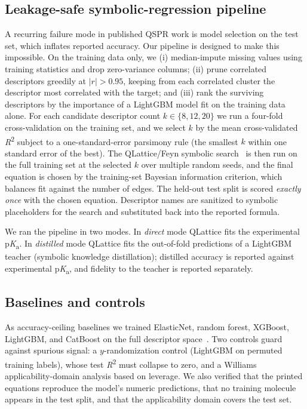 \documentclass[11pt]{article}
\newcommand{\pka}{p\textit{K}\textsubscript{a}}
\newcommand{\rtwo}{\textit{R}\textsuperscript{2}}
\begin{document}
\subsection{Leakage-safe symbolic-regression pipeline}
\label{sec:pipeline}

A recurring failure mode in published QSPR work is model selection on the test set, which
inflates reported accuracy. Our pipeline is designed to make this impossible. On the training
data only, we (i) median-impute missing values using training statistics and drop zero-variance
columns; (ii) prune correlated descriptors greedily at $|r|>0.95$, keeping from each correlated
cluster the descriptor most correlated with the target; and (iii) rank the surviving descriptors
by the importance of a LightGBM model fit on the training data alone. For each candidate
descriptor count $k\in\{8,12,20\}$ we run a four-fold cross-validation on the training set, and
we select $k$ by the mean cross-validated \rtwo{} subject to a one-standard-error parsimony rule
(the smallest $k$ within one standard error of the best). The QLattice/Feyn symbolic
search~\cite{brolos2021feyn} is then run on the full training set at the selected $k$ over
multiple random seeds, and the final equation is chosen by the training-set Bayesian information
criterion, which balances fit against the number of edges. The held-out test split is scored
\emph{exactly once} with the chosen equation. Descriptor names are sanitized to symbolic
placeholders for the search and substituted back into the reported formula.

We ran the pipeline in two modes. In \emph{direct} mode QLattice fits the experimental \pka{}.
In \emph{distilled} mode QLattice fits the out-of-fold predictions of a LightGBM teacher
(symbolic knowledge distillation); distilled accuracy is reported against experimental \pka{},
and fidelity to the teacher is reported separately.

\subsection{Baselines and controls}

As accuracy-ceiling baselines we trained ElasticNet, random forest, XGBoost, LightGBM, and
CatBoost on the full descriptor space~\cite{pedregosa2011sklearn,chen2016xgboost,ke2017lightgbm,prokhorenkova2018catboost}.
Two controls guard against spurious signal: a $y$-randomization control (LightGBM on permuted
training labels), whose test \rtwo{} must collapse to zero, and a Williams applicability-domain
analysis based on leverage. We also verified that the printed equations reproduce the model's
numeric predictions, that no training molecule appears in the test split, and that the
applicability domain covers the test set.
\end{document}
